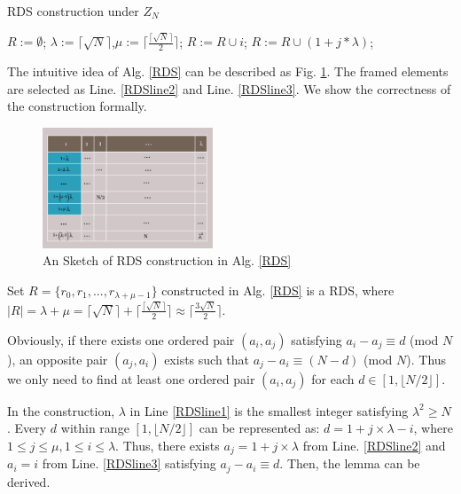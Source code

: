 \begin{algorithm}[!h]
\caption{RDS construction under $Z_N$}
\label{RDS}
\begin{algorithmic}[1]
\STATE $R :=\emptyset$; $\lambda :=\lceil \sqrt{N}  \rceil$,$\mu :=\lceil \frac{\lceil \sqrt{N} \rceil}{2} \rceil$;\label{RDSline1}
	\STATE $R :=R \cup i$; \label{RDSline2}
\ENDFOR
{}
	\STATE $R :=R \cup (1 + j * \lambda )$; \label{RDSline3}
\ENDFOR
\end{algorithmic}
\end{algorithm}


The intuitive idea of Alg. \ref{RDS} can be described as Fig. \ref{matrix}.
The framed elements are selected as Line. \ref{RDSline2} and Line. \ref{RDSline3}.
We show the correctness of the construction formally.

\begin{figure}[!h]
\centering
\includegraphics[width=2in]{./Figure/matrix}
\caption{An Sketch of RDS construction in Alg. \ref{RDS}}
\label{matrix}
\end{figure}


\begin{lemma}
\label{RDS1}
Set $R = \{r_0, r_1, ..., r_{\lambda + \mu - 1}\}$ constructed in Alg. \ref{RDS} is a RDS,
where $|R| = \lambda + \mu = \lceil \sqrt{N}  \rceil + \lceil \frac{\lceil \sqrt{N} \rceil}{2} \rceil
\approx \lceil \frac{3\sqrt{N}}{2}  \rceil$.
\end{lemma}


\begin{IEEEproof}
Obviously, if there exists one ordered pair $(a_i,a_j)$ satisfying  $a_i - a_j \equiv d$ (mod $N$),
an opposite pair $(a_j,a_i)$ exists such that
$a_j - a_i \equiv (N-d)$ (mod $N$). Thus we only need to find
at least one ordered pair $(a_i,a_j)$ for each $d \in [1, \lfloor N/2 \rfloor]$.

In the construction, $\lambda$ in Line \ref{RDSline1} is the smallest integer satisfying
$\lambda^2 \geq N$. Every $d$ within range $[1, \lfloor N/2 \rfloor]$
can be represented as: $ d = 1 + j \times \lambda - i$, where $1 \leq j \leq \mu,
1 \leq i \leq \lambda$. Thus, there exists $a_j = 1 + j \times \lambda$
from Line. \ref{RDSline2} and $a_i = i$ from Line. \ref{RDSline3}
satisfying  $a_j - a_i \equiv d$. Then, the lemma can be derived.
\end{IEEEproof}


